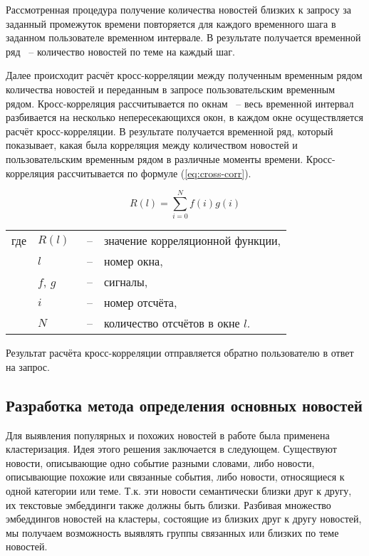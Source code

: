 Рассмотренная процедура получение количества новостей близких к запросу за заданный промежуток времени повторяется для каждого временного шага в заданном пользователе временном интервале. В результате получается временной ряд ~-- количество новостей по теме на каждый шаг.

Далее происходит расчёт кросс-корреляции между полученным временным рядом количества новостей и переданным в запросе пользовательским временным рядом. Кросс-корреляция рассчитывается по окнам ~-- весь временной интервал разбивается на несколько непересекающихся окон, в каждом окне осуществляется расчёт кросс-корреляции. В результате получается временной ряд, который показывает, какая была корреляция между количеством новостей и пользовательским временным рядом в различные моменты времени. Кросс-корреляция рассчитывается по формуле (\ref{eq:cross-corr}).

\begin{equation}
    R(l) = \sum_{i=0}^N{f(i)g(i)}
    \label{eq:cross-corr}
\end{equation}

\noindent\begin{tabularx}{\linewidth}{lllX}
    где & $R(l)$   &~--& значение корреляционной функции, \\
        & $l$      &~--& номер окна, \\
        & $f$, $g$ &~--& сигналы, \\
        & $i$      &~--& номер отсчёта, \\
        & $N$      &~--& количество отсчётов в окне $l$. \\
\end{tabularx}

Результат расчёта кросс-корреляции отправляется обратно пользователю в ответ на запрос.

\subsection{Разработка метода определения основных новостей}

Для выявления популярных и похожих новостей в работе была применена кластеризация. Идея этого решения заключается в следующем. Существуют новости, описывающие одно событие разными словами, либо новости, описывающие похожие или связанные события, либо новости, относящиеся к одной категории или теме. Т.к. эти новости семантически близки друг к другу, их текстовые эмбеддинги также должны быть близки. Разбивая множество эмбеддингов новостей на кластеры, состоящие из близких друг к другу новостей, мы получаем возможность выявлять группы связанных или близких по теме новостей.

